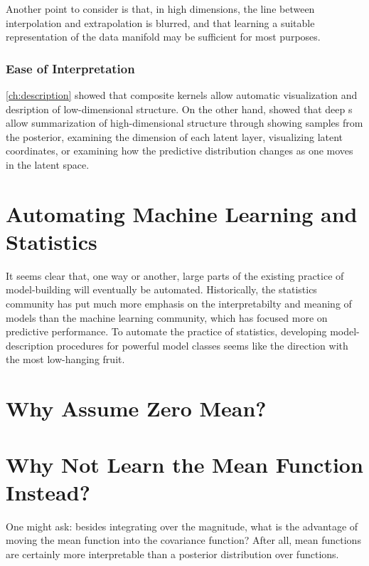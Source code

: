 Another point to consider is that, in high dimensions, the line between interpolation and extrapolation is blurred, and that learning a suitable representation of the data manifold may be sufficient for most purposes.

\subsubsection{Ease of Interpretation}
\cref{ch:description} showed that composite kernels allow automatic visualization and desription of low-dimensional structure.
On the other hand, \citet{damianou2012deep} showed that deep \gplvm{}s allow summarization of high-dimensional structure through showing samples from the posterior, examining the dimension of each latent layer, visualizing latent coordinates, or examining how the predictive distribution changes as one moves in the latent space.

\section{Automating Machine Learning and Statistics}

It seems clear that, one way or another, large parts of the existing practice of model-building will eventually be automated.
Historically, the statistics community has put much more emphasis on the interpretabilty and meaning of models than the machine learning community, which has focused more on predictive performance.
To automate the practice of statistics, developing model-description procedures for powerful model classes seems like the direction with the most low-hanging fruit.




\iffalse
\section{Why Assume Zero Mean?}

\section{Why Not Learn the Mean Function Instead?}
One might ask: besides integrating over the magnitude, what is the advantage of moving the mean function into the covariance function?
After all, mean functions are certainly more interpretable than a posterior distribution over functions.

